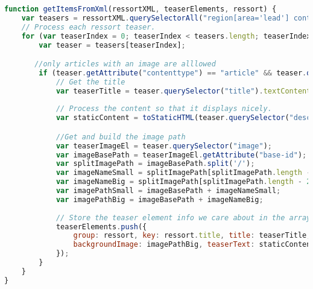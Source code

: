 \begin{lstlisting}[language= Javascript,caption=Parsen und speichern der Daten., label={lst:xmlparsing}]
function getItemsFromXml(ressortXML, teaserElements, ressort) {
    var teasers = ressortXML.querySelectorAll("region[area='lead'] container > block:first-child");
    // Process each ressort teaser.
    for (var teaserIndex = 0; teaserIndex < teasers.length; teaserIndex++) {
        var teaser = teasers[teaserIndex];

       //only articles with an image are alllowed
        if (teaser.getAttribute("contenttype") == "article" && teaser.querySelector("image") !== null) {
            // Get the title
            var teaserTitle = teaser.querySelector("title").textContent;
        
            // Process the content so that it displays nicely.
            var staticContent = toStaticHTML(teaser.querySelector("description").textContent);

            //Get and build the image path
            var teaserImageEl = teaser.querySelector("image");
            var imageBasePath = teaserImageEl.getAttribute("base-id");
            var splitImagePath = imageBasePath.split('/');
            var imageNameSmall = splitImagePath[splitImagePath.length - 2] + "-220x124.jpg";
            var imageNameBig = splitImagePath[splitImagePath.length - 2] + "-540x304.jpg";
            var imagePathSmall = imageBasePath + imageNameSmall;
            var imagePathBig = imageBasePath + imageNameBig;
            
            // Store the teaser element info we care about in the array.
            teaserElements.push({
                group: ressort, key: ressort.title, title: teaserTitle,
                backgroundImage: imagePathBig, teaserText: staticContent
            });
        }
    }
}
\end{lstlisting} 